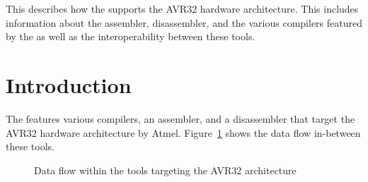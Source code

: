 




\renewcommand{\seeavrtt}{}

{This \documentation{} describes how the \ecs{} supports the AVR32 hardware architecture.
This includes information about the assembler, disassembler, and the various compilers featured by the \ecs{} as well as the interoperability between these tools.}

\section{Introduction}

The \ecs{} features various compilers, an assembler, and a disassembler that target the AVR32 hardware architecture by Atmel.
Figure~\ref{fig:avr32dataflow} shows the data flow in-between these tools.

\begin{figure}
\caption{Data flow within the tools targeting the AVR32 architecture}
\label{fig:avr32dataflow}
\end{figure}

